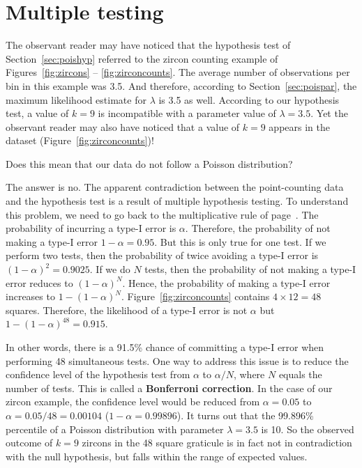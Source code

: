 \section{Multiple testing}
\label{sec:multipletesting}

The observant reader may have noticed that the hypothesis test of
Section~\ref{sec:poishyp} referred to the zircon counting example of
Figures~\ref{fig:zircons} -- \ref{fig:zirconcounts}. The average
number of observations per bin in this example was 3.5. And therefore,
according to Section~\ref{sec:poispar}, the maximum likelihood
estimate for $\lambda$ is 3.5 as well. According to our hypothesis
test, a value of $k=9$ is incompatible with a parameter value of
$\lambda=3.5$. Yet the observant reader may also have noticed that a
value of $k=9$ appears in the dataset
(Figure~\ref{fig:zirconcounts})!\medskip

Does this mean that our data do not follow a Poisson distribution?\medskip

The answer is no. The apparent contradiction between the
point-counting data and the hypothesis test is a result of multiple
hypothesis testing. To understand this problem, we need to go back to
the multiplicative rule of page~\pageref{page:multiplication}.  The
probability of incurring a type-I error is $\alpha$. Therefore, the
probability of not making a type-I error $1-\alpha=0.95$.  But this is
only true for one test. If we perform two tests, then the probability
of twice avoiding a type-I error is $(1-\alpha)^2=0.9025$. If we do
$N$ tests, then the probability of not making a type-I error reduces
to $(1-\alpha)^N$. Hence, the probability of making a type-I error
increases to $1-(1-\alpha)^N$. Figure~\ref{fig:zirconcounts} contains
${4}\times{12}=48$ squares. Therefore, the likelihood of a type-I
error is not $\alpha$ but $1-(1-\alpha)^{48}=0.915$.\medskip

In other words, there is a 91.5\% chance of committing a type-I error
when performing 48 simultaneous tests. One way to address this issue
is to reduce the confidence level of the hypothesis test from $\alpha$
to $\alpha/N$, where $N$ equals the number of tests.  This is called a
\textbf{Bonferroni correction}. In the case of our zircon example, the
confidence level would be reduced from $\alpha=0.05$ to
$\alpha=0.05/48=0.00104$ ($1-\alpha=0.99896$).  It turns out that the
99.896\% percentile of a Poisson distribution with parameter
$\lambda=3.5$ is 10. So the observed outcome of $k=9$ zircons in the
48 square graticule is in fact not in contradiction with the null
hypothesis, but falls within the range of expected values.\medskip

